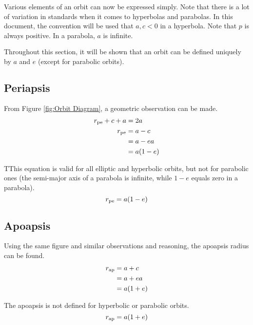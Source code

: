 \documentclass[../basicOrbitalDynamics.tex]{subfiles}
\begin{document}
Various elements of an orbit can now be expressed simply. Note that there is a lot of variation in standards when it comes to hyperbolas and parabolas. In this document, the convention will be used that $a, c<0$ in a hyperbola. Note that $p$ is always positive. In a parabola, $a$ is infinite.

Throughout this section, it will be shown that an orbit can be defined uniquely by $a$ and $e$ (except for parabolic orbits).

\bigskip\bigskip
\subsection{Periapsis}\label{sec:Periapsis Geometric}

From Figure \ref{fig:Orbit Diagram}, a geometric observation can be made.
\begin{align*}
    {r}_\text{pe}+c+a & = 2a     \\
    {r}_\text{pe}     & =a-c     \\
                    & =a-ea    \\
                    & = a(1-e)
\end{align*}

TThis equation is valid for all elliptic and hyperbolic orbits, but not for parabolic ones (the semi-major axis of a parabola is infinite, while $1-e$ equals zero in a parabola).
\begin{equation}\label{Periapsis Radius Geometric}
    {r}_\text{pe}=a(1-e)
\end{equation}

\bigskip\bigskip
\subsection{Apoapsis}\label{sec:Apoapsis Geometric}

Using the same figure and similar observations and reasoning, the apoapsis radius can be found.
\begin{align*}
    {r}_\text{ap} & = a+c   \\
                & =a+ea   \\
                & =a(1+e)
\end{align*}

The apoapsis is not defined for hyperbolic or parabolic orbits.
\begin{equation}\label{Apoapsis Radius Geometric}
    {r}_\text{ap}=a(1+e)
\end{equation}

\bigskip\bigskip
\end{document}

